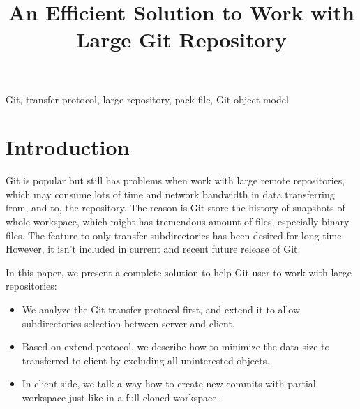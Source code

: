 \documentclass[preprint]{sigplanconf}
\begin{document}
\title{An Efficient Solution to Work with Large Git Repository}
\maketitle
{}

\keywords
Git, transfer protocol, large repository, pack file, Git object model

\section{Introduction}
Git is popular but still has problems when work with large remote repositories, which may consume lots of time and network bandwidth in data transferring from, and to, the repository.
The reason is Git store the history of snapshots of whole workspace, which might has tremendous amount of files, especially binary files.
The feature to only transfer subdirectories has been desired for long time.
However, it isn't included in current and recent future release of Git.

In this paper, we present a complete solution to help Git user to work with large repositories:
\begin{itemize}
  \item We analyze the Git transfer protocol first, and extend it to allow subdirectories selection between server and client.
  \item Based on extend protocol, we describe how to minimize the data size to transferred to client by excluding all uninterested objects.
  \item In client side, we talk a way how to create new commits with partial workspace just like in a full cloned workspace.
\end{itemize}
\end{document}
